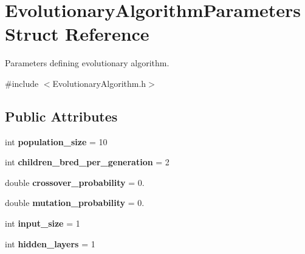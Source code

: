 \hypertarget{structEvolutionaryAlgorithmParameters}{}\section{Evolutionary\+Algorithm\+Parameters Struct Reference}
\label{structEvolutionaryAlgorithmParameters}


Parameters defining evolutionary algorithm.  




{\ttfamily \#include $<$Evolutionary\+Algorithm.\+h$>$}

\subsection*{Public Attributes}
\begin{DoxyCompactItemize}
\item 
int {\bfseries population\+\_\+size} = 10\hypertarget{structEvolutionaryAlgorithmParameters_a4063f5b8d45e272d997220fc742fc45b}{}\label{structEvolutionaryAlgorithmParameters_a4063f5b8d45e272d997220fc742fc45b}

\item 
int {\bfseries children\+\_\+bred\+\_\+per\+\_\+generation} = 2\hypertarget{structEvolutionaryAlgorithmParameters_a636a6f24b821c90ef920d939aa57c4fd}{}\label{structEvolutionaryAlgorithmParameters_a636a6f24b821c90ef920d939aa57c4fd}

\item 
double {\bfseries crossover\+\_\+probability} = 0.\hypertarget{structEvolutionaryAlgorithmParameters_a2590141f503f1f9ca21ec5ff00852bb2}{}\label{structEvolutionaryAlgorithmParameters_a2590141f503f1f9ca21ec5ff00852bb2}

\item 
double {\bfseries mutation\+\_\+probability} = 0.\hypertarget{structEvolutionaryAlgorithmParameters_ace9b11437747f8066fc96da4df7fcc82}{}\label{structEvolutionaryAlgorithmParameters_ace9b11437747f8066fc96da4df7fcc82}

\item 
int {\bfseries input\+\_\+size} = 1\hypertarget{structEvolutionaryAlgorithmParameters_a2f7d8ba28898a15142cb44ee1faa9339}{}\label{structEvolutionaryAlgorithmParameters_a2f7d8ba28898a15142cb44ee1faa9339}

\item 
int {\bfseries hidden\+\_\+layers} = 1\hypertarget{structEvolutionaryAlgorithmParameters_a5fe3939781c5abfdc1b971c7ef92fe65}{}\label{structEvolutionaryAlgorithmParameters_a5fe3939781c5abfdc1b971c7ef92fe65}


\end{DoxyCompactItemize}
